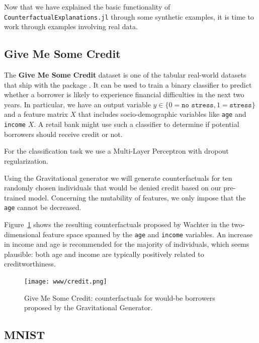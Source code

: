 \documentclass{juliacon}
\begin{document}
Now that we have explained the basic functionality of
\texttt{CounterfactualExplanations.jl} through some synthetic examples,
it is time to work through examples involving real data.

\hypertarget{give-me-some-credit}{%
\subsection{Give Me Some Credit}\label{give-me-some-credit}}

The \textbf{Give Me Some Credit} dataset is one of the tabular
real-world datasets that ship with the package \cite{kaggle2011give}. It
can be used to train a binary classifier to predict whether a borrower
is likely to experience financial difficulties in the next two years. In
particular, we have an output variable
\(y \in \{0=\texttt{no stress},1=\texttt{stress}\}\) and a feature
matrix \(X\) that includes socio-demographic variables like \texttt{age}
and \texttt{income} \(X\). A retail bank might use such a classifier to
determine if potential borrowers should receive credit or not.

For the classification task we use a Multi-Layer Perceptron with dropout
regularization.

Using the Gravitational generator \cite{altmeyer2023endogenous} we will
generate counterfactuals for ten randomly chosen individuals that would
be denied credit based on our pre-trained model. Concerning the
mutability of features, we only impose that the \texttt{age} cannot be
decreased.

Figure~\ref{fig-credit} shows the resulting counterfactuals proposed by
Wachter in the two-dimensional feature space spanned by the \texttt{age}
and \texttt{income} variables. An increase in income and age is
recommended for the majority of individuals, which seems plausible: both
age and income are typically positively related to creditworthiness.

\begin{figure}

{\centering \texttt{[image: www/credit.png]}

}

\caption{\label{fig-credit}Give Me Some Credit: counterfactuals for
would-be borrowers proposed by the Gravitational Generator.}

\end{figure}

\hypertarget{mnist}{%
\subsection{MNIST}\label{mnist}}
\end{document}
